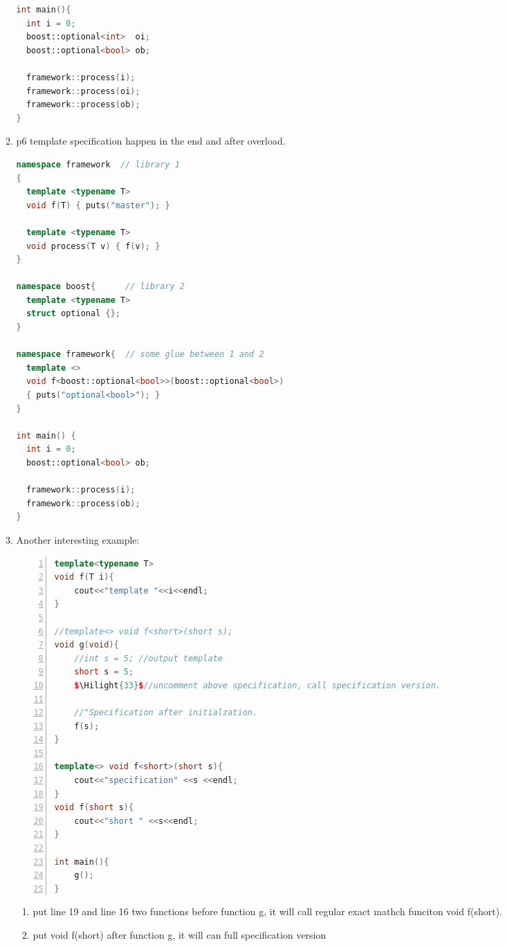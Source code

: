 \documentclass[a4paper,11pt,twoside]{book}
\newcommand{\Hilight}[1]{\makebox[0pt][l]{\color{yellow}\rule[-3pt]{#1em}{11pt}}}
\newcommand{\Hilight}[1]{}
\begin{document}
\begin{itemize}
\begin{enumerate}
\begin{lstlisting}[frame=single, language=c++]
int main(){
  int i = 0;
  boost::optional<int>  oi;
  boost::optional<bool> ob;
  
  framework::process(i);
  framework::process(oi);
  framework::process(ob);
}
\end{lstlisting}

\item p6 template specification happen in the end and after overload. 
\begin{lstlisting}[frame=single, language=c++]
namespace framework  // library 1
{
  template <typename T>
  void f(T) { puts("master"); }
 
  template <typename T>
  void process(T v) { f(v); } 
}
 
namespace boost{      // library 2
  template <typename T>
  struct optional {};
}
 
namespace framework{  // some glue between 1 and 2
  template <>
  void f<boost::optional<bool>>(boost::optional<bool>)
  { puts("optional<bool>"); }
}
 
int main() {
  int i = 0;
  boost::optional<bool> ob;
  
  framework::process(i);
  framework::process(ob);
}
\end{lstlisting}

\item Another interesting example:
\begin{lstlisting}[frame=single, language=c++, numbers=left,
stepnumber=1,]
template<typename T>
void f(T i){
	cout<<"template "<<i<<endl;
}

//template<> void f<short>(short s);
void g(void){
	//int s = 5; //output template
	short s = 5; 
	$\Hilight{33}$//uncomment above specification, call specification version.

	//"Specification after initialzation.
	f(s);
}

template<> void f<short>(short s){
	cout<<"specification" <<s <<endl;
}
void f(short s){
	cout<<"short " <<s<<endl;
}

int main(){
	g();
}
\end{lstlisting}


\begin{enumerate}
	\item put line 19 and line 16 two  functions before function g, it will call regular exact mathch funciton void f(short). 
	
	\item put void f(short) after function g, it will can full specification version
	

\end{enumerate}
\end{enumerate}
\end{itemize}
\end{document}
